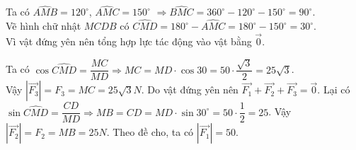 \begin{ex}
{\begin{center}
		\end{center}
		Ta có $\widehat{AMB}=120^{\circ}$, $\widehat{AMC}=150^{\circ}$ $\Rightarrow \widehat{BMC}=360^{\circ}-120^{\circ}-150^{\circ}=90^{\circ}$.\\
		Vẽ hình chữ nhật $MCDB$ có $\widehat{CMD}=180^{\circ}-\widehat{AMC}=180^{\circ}-150^{\circ}=30^{\circ}$.\\
		Vì vật đứng yên nên tổng hợp lực tác động vào vật bằng $\overrightarrow{0}$.
		\begin{itemchoice}
			\itemch Ta có $\cos \widehat{CMD}=\dfrac{MC}{MD} \Rightarrow MC=MD \cdot \cos 30 =50 \cdot \dfrac{\sqrt{3}}{2}=25\sqrt{3}$.\\
			Vậy $|\overrightarrow{F_{3}}|=F_{3}=MC=25\sqrt{3}N$.
			\itemch Do vật đứng yên nên $\overrightarrow{F_{1}}+\overrightarrow{F_{2}}+\overrightarrow{F_{3}}=\overrightarrow{0}$.
			\itemch 	Lại có $\sin \widehat{CMD}=\dfrac{CD}{MD} \Rightarrow MB=CD=MD \cdot \sin 30^{\circ}=50 \cdot \dfrac{1}{2}=25$.
			Vậy $|\overrightarrow{F_{2}}|=F_{2}=MB=25N$.
			\itemch Theo đề cho, ta có $|\overrightarrow{F_{1}}|=50$.
		\end{itemchoice}
	}
\end{ex}


